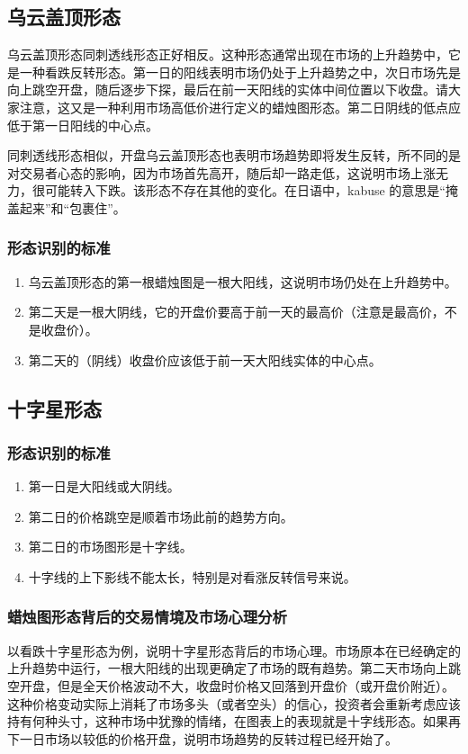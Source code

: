 \subsection*{乌云盖顶形态}
乌云盖顶形态同刺透线形态正好相反。这种形态通常出现在市场的上升趋势中，它是一种看跌反转形态。第一日的阳线表明市场仍处于上升趋势之中，次日市场先是向上跳空开盘，随后逐步下探，最后在前一天阳线的实体中间位置以下收盘。请大家注意，这又是一种利用市场高低价进行定义的蜡烛图形态。第二日阴线的低点应低于第一日阳线的中心点。

同刺透线形态相似，开盘乌云盖顶形态也表明市场趋势即将发生反转，所不同的是对交易者心态的影响，因为市场首先高开，随后却一路走低，这说明市场上涨无力，很可能转入下跌。该形态不存在其他的变化。在日语中，kabuse 的意思是“掩盖起来”和“包裹住”。
\subsubsection*{形态识别的标准}
\begin{enumerate}
    \item 乌云盖顶形态的第一根蜡烛图是一根大阳线，这说明市场仍处在上升趋势中。
    \item 第二天是一根大阴线，它的开盘价要高于前一天的最高价（注意是最高价，不是收盘价）。
    \item 第二天的（阴线）收盘价应该低于前一天大阳线实体的中心点。
\end{enumerate}
\subsection{十字星形态}
\subsubsection*{形态识别的标准}
\begin{enumerate}
    \item 第一日是大阳线或大阴线。
    \item 第二日的价格跳空是顺着市场此前的趋势方向。
    \item 第二日的市场图形是十字线。
    \item 十字线的上下影线不能太长，特别是对看涨反转信号来说。
\end{enumerate}
\subsubsection*{蜡烛图形态背后的交易情境及市场心理分析}
以看跌十字星形态为例，说明十字星形态背后的市场心理。市场原本在已经确定的上升趋势中运行，一根大阳线的出现更确定了市场的既有趋势。第二天市场向上跳空开盘，但是全天价格波动不大，收盘时价格又回落到开盘价（或开盘价附近）。这种价格变动实际上消耗了市场多头（或者空头）的信心，投资者会重新考虑应该持有何种头寸，这种市场中犹豫的情绪，在图表上的表现就是十字线形态。如果再下一日市场以较低的价格开盘，说明市场趋势的反转过程已经开始了。
